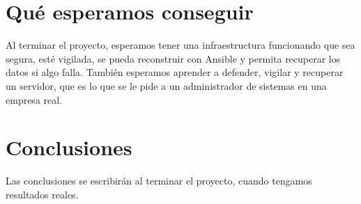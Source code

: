 \documentclass[11pt,a4paper]{report}
\begin{document}
\section{Qué esperamos conseguir}
 Al terminar el proyecto, esperamos tener una infraestructura funcionando que sea segura, esté vigilada, se pueda reconstruir con Ansible y permita recuperar los datos si algo falla. También esperamos aprender a defender, vigilar y recuperar un servidor, que es lo que se le pide a un administrador de sistemas en una empresa real. 
\section{Conclusiones}
 Las conclusiones se escribirán al terminar el proyecto, cuando tengamos resultados reales.
\end{document}
